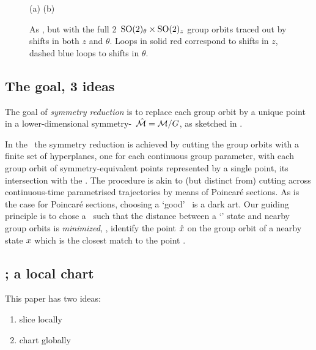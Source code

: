 \begin{figure}
  \centering
(a)%
(b)%
  \caption{\label{fig:2830GO6}
As , but with the
full 2\dmn\ $\textrm{SO}(2)_{\theta} \times \textrm{SO}(2)_z$ group orbits traced out
by shifts in both $z$ and $\theta$. Loops in solid red correspond to
shifts in $z$, dashed blue loops to shifts in $\theta$.
  }
\end{figure}

\subsection{The goal, 3 ideas}

The goal of \emph{symmetry reduction} is to replace each group orbit by a
unique point in a lower-dimensional symmetry-\reducedsp\ $\hat{\cal M} =
{\cal M}/G$, as sketched in .

In the \mslices\ the symmetry reduction is achieved by cutting the group
orbits with a finite set of hyperplanes, one for each continuous group
parameter, with each group orbit of symmetry-equivalent points
represented by a single point, its intersection with the \slice. The
procedure is akin to (but distinct from) cutting across continuous-time
parametrised trajectories by means of Poincar\'e sections. As is the case
for Poincar\'e sections, choosing a `good' \slice\ is a dark art.
Our guiding principle is to chose a \slice\ such that the distance
between a `{\template}' state {\slicep} and nearby group orbits is
\emph{minimized}, \ie, identify the point $\hat{x}$ on the group orbit
 of a nearby state $x$ which is the closest match to
the {\template} point {\slicep}.

\subsection{\Mslices; a local chart}

This paper has two ideas:
\begin{enumerate}
  \item slice locally
  \item chart globally
\end{enumerate}

